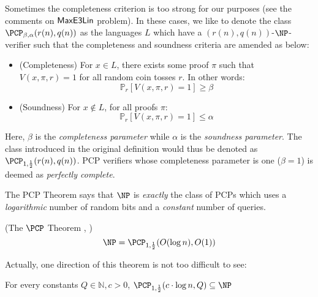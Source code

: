 \begin{remark}
  Sometimes the completeness criterion is too strong for our purposes (see the comments on $\mathsf{MaxE3Lin}$ problem). In these cases, we like to denote the class $\PCP_{\beta, \alpha}(r(n),q(n))$ as the languages $L$ which have a $(r(n),q(n))$-$\NP$-verifier such that the completeness and soundness criteria are amended as below: \newline

  \begin{itemize}
    \item (Completeness) For $x \in L$, there exists some proof $\pi$ such that $V(x,\pi,r) = 1$ for all random coin tosses $r$. In other words:
    \begin{equation}
      \mathbb{P}_{r}[V(x,\pi,r) = 1] \geq \beta
    \end{equation}

    \item (Soundness) For $x \not\in L$, for all proofs $\pi$:
    \begin{equation}
      \mathbb{P}_{r}[V(x,\pi,r) = 1] \leq \alpha
    \end{equation}
  \end{itemize}
Here, $\beta$ is the \emph{completeness parameter} while $\alpha$ is the \emph{soundness parameter}. The class introduced in the original definition would thus be denoted as $\PCP_{1,\frac{1}{2}}(r(n),q(n))$. PCP verifiers whose completeness parameter is one ($\beta = 1$) is deemed as \emph{perfectly complete}.
\end{remark}

The PCP Theorem says that $\NP$ is \emph{exactly} the class of PCPs which uses a \emph{logarithmic} number of random bits and a \emph{constant} number of queries.
%
\begin{theorem} \label{pcptheorem} (The $\PCP$ Theorem \cite{arora1998proof}, \cite{arora1998probabilistic})
%
\begin{equation}
\NP = \PCP_{1,\frac{1}{2}}(O(\log{n}), O(1))
\end{equation}
\end{theorem}

Actually, one direction of this theorem is not too difficult to see:

\begin{proposition}
For every constants $Q \in \mathbb{N}, c > 0$, $\PCP_{1,\frac{1}{2}}(c\cdot\log{n}, Q) \subseteq \NP$
\end{proposition}

